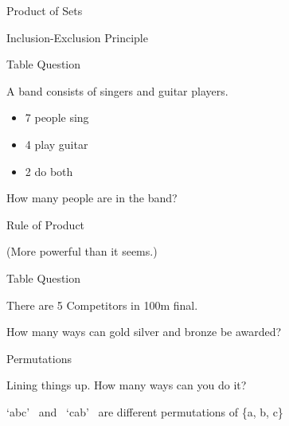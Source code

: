 \begin{frame}{Product of Sets}

{\LARGE
{}
}

\end{frame}

\begin{frame}{Inclusion-Exclusion Principle}
\end{frame}

\begin{frame}{Table Question}

{\Large
A band consists of singers and guitar players.

\begin{itemize}
\item 7 people sing
\item 4 play guitar
\item 2 do both
\end{itemize}

How many people are in the band?
}
\end{frame}

\begin{frame}{Rule of Product}

{\Large

\bigskip
\bigskip


\bigskip
\bigskip
\bigskip
\bigskip

\bigskip
(More powerful than it seems.)
}
\end{frame}

\begin{frame}{Table Question}

{\Large
There are 5 Competitors in 100m final. 

\medskip

How many ways can gold silver and bronze be awarded?
}

\bigskip
{}

\end{frame}

\begin{frame}{Permutations}

{\Large Lining things up. How many ways can you do it? 

\bigskip
\bigskip

`abc' \,  and \, `cab' \, are different permutations of \{a, b, c\}

}


\end{frame}

